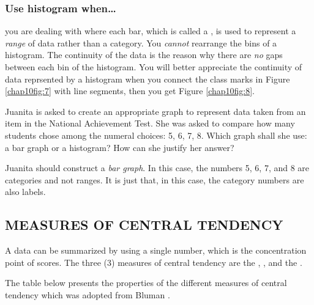 \subsubsection*{Use histogram when\ldots}
you are dealing with  where each bar, which is called a , is used to represent a \textit{range} of data rather than a category. You \textit{cannot} rearrange the bins of a histogram. The continuity of the data is the reason why there are \textit{no} gaps between each bin of the histogram. You will better appreciate the continuity of data reprsented by a histogram when you connect the class marks in Figure \eqref{chap10fig:7} with line segments, then you get Figure \eqref{chap10fig:8}.

\begin{example}
\Item Juanita is asked to create an appropriate graph to represent data taken from an item in the National Achievement Test. She was asked to compare how many students chose among the numeral choices: 5, 6, 7, 8. Which graph shall she use: a bar graph or a histogram? How can she justify her answer?

\Solution

Juanita should construct a \textit{bar graph}. In this case, the numbers 5, 6, 7, and 8 are categories and not ranges. It is just that, in this case, the category numbers are also labels.

\end{example}


\subsection*{MEASURES OF CENTRAL TENDENCY}
A data can be summarized by using a single number, which is the
concentration point of scores. The three (3) measures of central tendency are the
, , and the .

The table below presents the properties of the different measures of central tendency
which was adopted from Bluman \textcite{bulman}.

